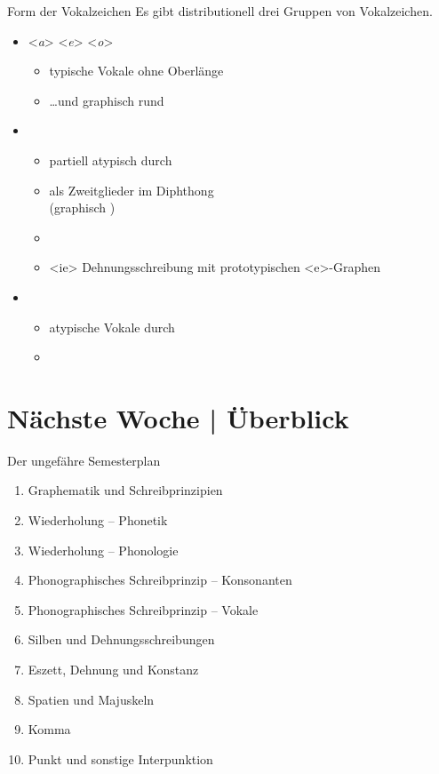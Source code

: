 \begin{frame}
  {Form der Vokalzeichen}
  \onslide<+->
  \onslide<+->
  Es gibt distributionell drei Gruppen von Vokalzeichen.\\
  \Zeile
  \begin{itemize}[<+->]
    \item \alert{<\textit{a}> <\textit{e}> <\textit{o}>}
      \begin{itemize}[<+->]
        \item typische Vokale \alert{ohne Oberlänge}
        \item \ldots und \alert{graphisch rund}
      \end{itemize}
      \Halbzeile
    \item {}
      \begin{itemize}[<+->]
        \item partiell atypisch durch 
        \item als Zweitglieder im Diphthong \\
          (graphisch )
        \item {}
        \item{} <ie> Dehnungsschreibung mit prototypischen <e>-Graphen
      \end{itemize}
      \Halbzeile
    \item {}
      \begin{itemize}[<+->]
        \item atypische Vokale durch 
        \item {}
      \end{itemize}
  \end{itemize}
\end{frame}

\ifdefined\TITLE
  \section{Nächste Woche | Überblick}

  \begin{frame}
    {Der ungefähre Semesterplan}
    \begin{enumerate}[<+->]
      \item Graphematik und Schreibprinzipien
      \item Wiederholung -- Phonetik
      \item Wiederholung -- Phonologie
      \item Phonographisches Schreibprinzip -- Konsonanten
      \item Phonographisches Schreibprinzip -- Vokale
      \item \alert{Silben und Dehnungsschreibungen}
      \item Eszett, Dehnung und Konstanz
      \item Spatien und Majuskeln
      \item Komma
      \item Punkt und sonstige Interpunktion
    \end{enumerate}
  \end{frame}
\fi
